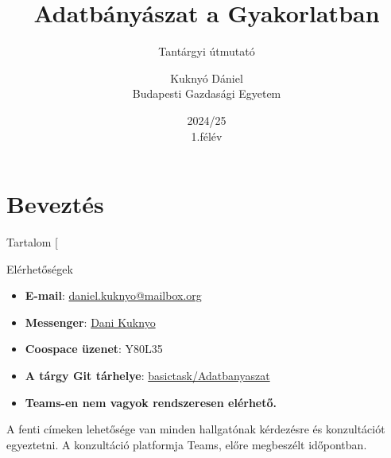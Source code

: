 \documentclass[english, aspectratio=169]{beamer}
\makeatletter
\newcommand\makebeamertitle{\frame{\maketitle}}
\let\origtableofcontents=\tableofcontents
\def\tableofcontents{\@ifnextchar[{\origtableofcontents}{\gobbletableofcontents}}
\def\gobbletableofcontents#1{\origtableofcontents}
\makeatother
\begin{document}
	\section{Beveztés}
	\title[]{Adatbányászat a Gyakorlatban}
	\subtitle{Tantárgyi útmutató}
	\author[Kuknyó Dániel]{Kuknyó Dániel\\Budapesti Gazdasági Egyetem}
	\date{2024/25\\1.félév}
	\makebeamertitle
	
	\begin{frame}{Tartalom}
		\tableofcontents{}
	\end{frame}
	
	\begin{frame}{Elérhetőségek}
		\begin{center}
			\begin{itemize}
				\item \textbf{E-mail}: \href{mailto:daniel.kuknyo@mailbox.org}{daniel.kuknyo@mailbox.org}
				\item \textbf{Messenger}: \href{https://www.facebook.com/dani.kkny/}{Dani Kuknyo}
				\item \textbf{Coospace üzenet}: Y80L35
				\item \textbf{A tárgy Git tárhelye}: \href{https://github.com/basictask/Adatbanyaszat}{basictask/Adatbanyaszat}
				\item \textbf{Teams-en nem vagyok rendszeresen elérhető.} 
			\end{itemize}
		\end{center}
		A fenti címeken lehetősége van minden hallgatónak kérdezésre és konzultációt egyeztetni. A konzultáció platformja Teams, előre megbeszélt időpontban.
	\end{frame}
	
\end{document}
